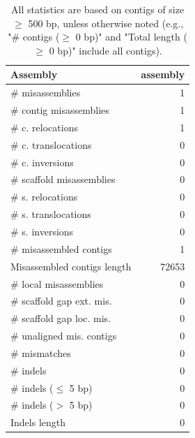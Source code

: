 \documentclass[12pt,a4paper]{article}
\begin{document}
\begin{table}[ht]
\begin{center}
\caption{All statistics are based on contigs of size $\geq$ 500 bp, unless otherwise noted (e.g., "\# contigs ($\geq$ 0 bp)" and "Total length ($\geq$ 0 bp)" include all contigs).}
\begin{tabular}{|l*{1}{|r}|}
\hline
Assembly & assembly \\ \hline
\# misassemblies & 1 \\ \hline
\hspace{2mm}\# contig misassemblies & 1 \\ \hline
\hspace{5mm}\# c. relocations & 1 \\ \hline
\hspace{5mm}\# c. translocations & 0 \\ \hline
\hspace{5mm}\# c. inversions & 0 \\ \hline
\hspace{2mm}\# scaffold misassemblies & 0 \\ \hline
\hspace{5mm}\# s. relocations & 0 \\ \hline
\hspace{5mm}\# s. translocations & 0 \\ \hline
\hspace{5mm}\# s. inversions & 0 \\ \hline
\# misassembled contigs & 1 \\ \hline
Misassembled contigs length & 72653 \\ \hline
\# local misassemblies & 0 \\ \hline
\# scaffold gap ext. mis. & 0 \\ \hline
\# scaffold gap loc. mis. & 0 \\ \hline
\# unaligned mis. contigs & 0 \\ \hline
\# mismatches & 0 \\ \hline
\# indels & 0 \\ \hline
\hspace{5mm}\# indels ($\leq$ 5 bp) & 0 \\ \hline
\hspace{5mm}\# indels ($>$ 5 bp) & 0 \\ \hline
Indels length & 0 \\ \hline
\end{tabular}
\end{center}
\end{table}
\end{document}
